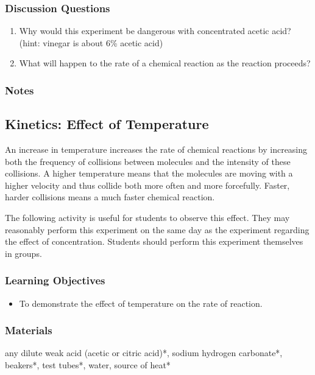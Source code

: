 \subsubsection*{Discussion Questions}
\begin{enumerate}
\item{Why would this experiment be dangerous with concentrated acetic acid? (hint: vinegar is about 6\% acetic acid)}
\item{What will happen to the rate of a chemical reaction as the reaction proceeds?}
\end{enumerate}

\subsubsection*{Notes}

\subsection{Kinetics: Effect of Temperature}

An increase in temperature increases the rate of chemical reactions by increasing both the frequency of collisions between molecules and the intensity of these collisions. A higher temperature means that the molecules are moving with a higher velocity and thus collide both more often and more forcefully. Faster, harder collisions means a much faster chemical reaction.

The following activity is useful for students to observe this effect. They may reasonably perform this experiment on the same day as the experiment regarding the effect of concentration. Students should perform this experiment themselves in groups.

\subsubsection*{Learning Objectives}
\begin{itemize}
\item{To demonstrate the effect of temperature on the rate of reaction.}
\end{itemize}

\subsubsection*{Materials}
any dilute weak acid (acetic or citric acid)*, sodium hydrogen carbonate*, beakers*, test tubes*, water, source of heat*


